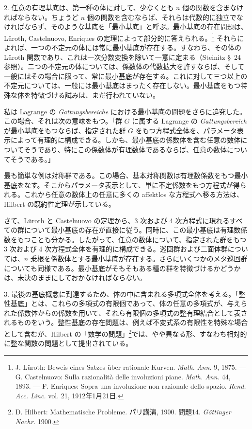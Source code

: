 \documentclass[11pt]{jlreq}
\begin{document}
2. 任意の有理基底は、第一種の体に対して、少なくとも $n$ 個の関数を含まなければならない。ちょうど $n$ 個の関数を含むならば、それらは代数的に独立でなければならず、そのような基底を「最小基底」と呼ぶ。最小基底の存在問題は、Lüroth, Castelnuovo, Enriques の定理によって部分的に答えられる。\footnote{J. Lüroth: Beweis eines Satzes über rationale Kurven. \emph{Math. Ann.} 9, 1875. --- G. Castelnuovo: Sulla razionalità delle involuzioni piane. \emph{Math. Ann.} 44, 1893. --- F. Enriques: Sopra una involuzione non razionale dello spazio. \emph{Rend. Acc. Linc.} vol. 21, 1912年1月21日.} それらによれば、一つの不定元の体には常に最小基底が存在する。すなわち、その体の Lüroth 関数であり、これは一次分数変換を除いて一意に定まる（Steinitz \S\ 24 参照）。二つの不定元の体については、係数体の代数拡大を許すならば、そして一般にはその場合に限って、常に最小基底が存在する。これに対して三つ以上の不定元については、一般には最小基底はまったく存在しない。最小基底をもつ特殊な体を特徴づける試みは、まだ行われていない。

私は Lagrange の \emph{Gattungsbereiche} における最小基底の問題をさらに追究した。この場合、それは次の意味をもつ。「群 $G$ に属する Lagrange の \emph{Gattungsbereich} が最小基底をもつならば、指定された群 $G$ をもつ方程式全体を、パラメータ表示によって有理的に構成できる。しかも、最小基底の係数体を含む任意の数体についてそうであり、特にこの係数体が有理数体であるならば、任意の数体についてそうである。」

最も簡単な例は対称群である。この場合、基本対称関数は有理数係数をもつ最小基底をなす。そこからパラメータ表示として、単に不定係数をもつ方程式が得られる。これから任意の数体上の任意に多くの affektlos な方程式へ移る方法は、Hilbert の既約性定理が示している。

さて、Lüroth と Castelnuovo の定理から、3 次および 4 次方程式に現れるすべての群について最小基底の存在が直接に従う。同時に、この最小基底は有理数係数をもつことも分かる。したがって、任意の数体について、指定された群をもつ 3 次および 4 次方程式全体を有理的に構成できる。巡回群および二面体群については、$n$ 乗根を係数体とする最小基底が存在する。さらにいくつかのメタ巡回群についても同様である。最小基底がそもそもある種の群を特徴づけるかどうかは、未決のままにしておかなければならない。

3. 最後の基底概念に到達するため、体の中に含まれる多項式全体を考える。「整性基底」とは、これらの多項式の有限個であって、体の任意の多項式が、与えられた係数体からの係数を用いて、それら有限個の多項式の整有理結合として表されるものをいう。整性基底の存在問題は、例えば不変式系の有限性を特殊な場合として含むが、Hilbert の「数学の問題」\footnote{D. Hilbert: Mathematische Probleme. パリ講演, 1900. 問題14. \emph{Göttinger Nachr.} 1900.}では、やや異なる形、すなわち相対的に整な関数の問題として提出されている。
\end{document}
